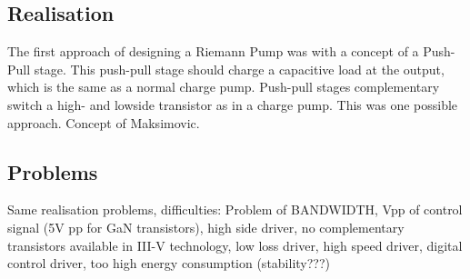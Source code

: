\subsection{Realisation}
The first approach of designing a Riemann Pump was with a concept of a Push-Pull stage. This push-pull stage should charge a capacitive load at the output, which is the same as a normal charge pump. Push-pull stages complementary switch a high- and lowside transistor as in a charge pump. This was one possible approach. Concept of Maksimovic. 
\subsection{Problems}
Same realisation problems, difficulties: Problem of BANDWIDTH, Vpp of control signal (5V pp for GaN transistors), high side driver, no complementary transistors available in III-V technology, low loss driver, high speed driver, digital control driver, too high energy consumption (stability???)